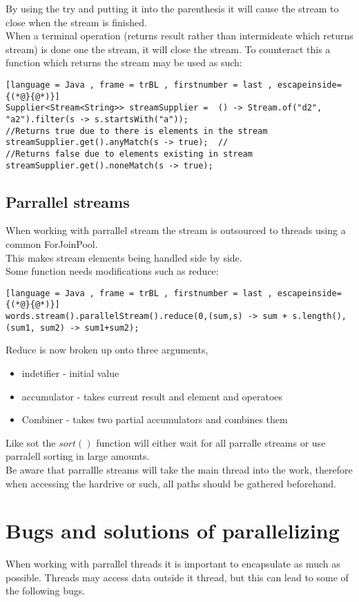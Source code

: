 \documentclass[12pt, a4paper]{article}
\begin{document}
		By using the try and putting it into the parenthesis it will cause the stream to close when the stream is finished.\\
		When a terminal operation (returns result rather than intermideate which returns stream) is done one the stream, it will close the stream. To counteract this a function which returns the stream may be used as such:
	\begin{lstlisting}[language = Java , frame = trBL , firstnumber = last , escapeinside={(*@}{@*)}]
Supplier<Stream<String>> streamSupplier =  () -> Stream.of("d2", "a2").filter(s -> s.startsWith("a"));
//Returns true due to there is elements in the stream
streamSupplier.get().anyMatch(s -> true);  //
//Returns false due to elements existing in stream
streamSupplier.get().noneMatch(s -> true); 
\end{lstlisting}	
	\subsection{Parrallel streams}
		When working with parrallel stream the stream is outsourced to threads using a common ForJoinPool.\\
		This makes stream elements being handled side by side.\\
		Some function needs modifications such as reduce:
\begin{lstlisting}[language = Java , frame = trBL , firstnumber = last , escapeinside={(*@}{@*)}]
words.stream().parallelStream().reduce(0,(sum,s) -> sum + s.length(), (sum1, sum2) -> sum1+sum2);
\end{lstlisting}		
	Reduce is now broken up onto three arguments,
	\begin{itemize}
		\item indetifier - initial value
		\item accumulator - takes current result and element and operatoes
		\item Combiner - takes two partial accumulators and combines them
	\end{itemize}
	Like sot the $sort()$ function will either wait for all parralle streams or use parralell sorting in large amounts.\\
	Be aware that parrallle streams will take the main thread into the work, therefore when accessing the hardrive or such, all paths should be gathered beforehand.
\section{Bugs and solutions of parallelizing}
	When working with parrallel threads it is important to encapsulate as much as possible. Threads may access data outside it thread, but this can lead to some of the following bugs.
\end{document}
